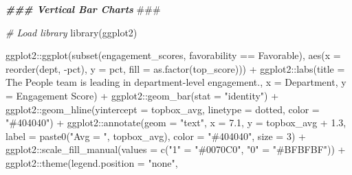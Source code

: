 \documentclass[
]{book}
\newenvironment{Shaded}{\begin{snugshade}}{\end{snugshade}}
\newcommand{\AlertTok}[1]{\textcolor[rgb]{0.94,0.16,0.16}{#1}}
\newcommand{\AttributeTok}[1]{\textcolor[rgb]{0.77,0.63,0.00}{#1}}
\newcommand{\CommentTok}[1]{\textcolor[rgb]{0.56,0.35,0.01}{\textit{#1}}}
\newcommand{\DecValTok}[1]{\textcolor[rgb]{0.00,0.00,0.81}{#1}}
\newcommand{\DocumentationTok}[1]{\textcolor[rgb]{0.56,0.35,0.01}{\textbf{\textit{#1}}}}
\newcommand{\FloatTok}[1]{\textcolor[rgb]{0.00,0.00,0.81}{#1}}
\newcommand{\FunctionTok}[1]{\textcolor[rgb]{0.00,0.00,0.00}{#1}}
\newcommand{\NormalTok}[1]{#1}
\newcommand{\OtherTok}[1]{\textcolor[rgb]{0.56,0.35,0.01}{#1}}
\newcommand{\SpecialCharTok}[1]{\textcolor[rgb]{0.00,0.00,0.00}{#1}}
\newcommand{\StringTok}[1]{\textcolor[rgb]{0.31,0.60,0.02}{#1}}
\begin{document}
\begin{Shaded}
\begin{Highlighting}[]
\DocumentationTok{\#\#\# Vertical Bar Charts }\AlertTok{\#\#\#}

\CommentTok{\# Load library}
\FunctionTok{library}\NormalTok{(ggplot2)}

\NormalTok{ggplot2}\SpecialCharTok{::}\FunctionTok{ggplot}\NormalTok{(}\FunctionTok{subset}\NormalTok{(engagement\_scores, favorability }\SpecialCharTok{==} \StringTok{\textquotesingle{}Favorable\textquotesingle{}}\NormalTok{), }\FunctionTok{aes}\NormalTok{(}\AttributeTok{x =} \FunctionTok{reorder}\NormalTok{(dept, }\SpecialCharTok{{-}}\NormalTok{pct), }\AttributeTok{y =}\NormalTok{ pct, }\AttributeTok{fill =} \FunctionTok{as.factor}\NormalTok{(top\_score))) }\SpecialCharTok{+}
\NormalTok{ggplot2}\SpecialCharTok{::}\FunctionTok{labs}\NormalTok{(}\AttributeTok{title =} \StringTok{\textquotesingle{}The People team is leading in department{-}level engagement.\textquotesingle{}}\NormalTok{, }\AttributeTok{x =} \StringTok{\textquotesingle{}Department\textquotesingle{}}\NormalTok{, }\AttributeTok{y =} \StringTok{\textquotesingle{}Engagement Score\textquotesingle{}}\NormalTok{) }\SpecialCharTok{+}
\NormalTok{ggplot2}\SpecialCharTok{::}\FunctionTok{geom\_bar}\NormalTok{(}\AttributeTok{stat =} \StringTok{"identity"}\NormalTok{) }\SpecialCharTok{+}
\NormalTok{ggplot2}\SpecialCharTok{::}\FunctionTok{geom\_hline}\NormalTok{(}\AttributeTok{yintercept =}\NormalTok{ topbox\_avg, }\AttributeTok{linetype =} \StringTok{\textquotesingle{}dotted\textquotesingle{}}\NormalTok{, }\AttributeTok{color =} \StringTok{"\#404040"}\NormalTok{) }\SpecialCharTok{+} 
\NormalTok{ggplot2}\SpecialCharTok{::}\FunctionTok{annotate}\NormalTok{(}\AttributeTok{geom =} \StringTok{"text"}\NormalTok{, }\AttributeTok{x =} \FloatTok{7.1}\NormalTok{, }\AttributeTok{y =}\NormalTok{ topbox\_avg }\SpecialCharTok{+} \FloatTok{1.3}\NormalTok{, }\AttributeTok{label =} \FunctionTok{paste0}\NormalTok{(}\StringTok{"Avg = "}\NormalTok{, topbox\_avg), }\AttributeTok{color =} \StringTok{"\#404040"}\NormalTok{, }\AttributeTok{size =} \DecValTok{3}\NormalTok{) }\SpecialCharTok{+}
\NormalTok{ggplot2}\SpecialCharTok{::}\FunctionTok{scale\_fill\_manual}\NormalTok{(}\AttributeTok{values =} \FunctionTok{c}\NormalTok{(}\StringTok{"1"} \OtherTok{=} \StringTok{"\#0070C0"}\NormalTok{,}
                                      \StringTok{"0"} \OtherTok{=} \StringTok{"\#BFBFBF"}\NormalTok{)) }\SpecialCharTok{+}
\NormalTok{ggplot2}\SpecialCharTok{::}\FunctionTok{theme}\NormalTok{(}\AttributeTok{legend.position =} \StringTok{"none"}\NormalTok{,}

\end{Highlighting}
\end{Shaded}
\end{document}
